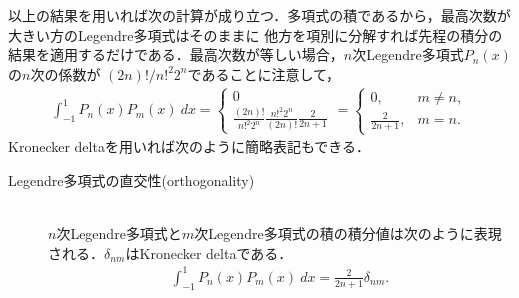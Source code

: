 \documentclass[a4j,papersize,disablejfam,slide,14pt]{jsarticle}
\begin{document}
    以上の結果を用いれば次の計算が成り立つ．多項式の積であるから，最高次数が大きい方の{\rm Legendre}多項式はそのままに
    他方を項別に分解すれば先程の積分の結果を適用するだけである．最高次数が等しい場合，$n$次{\rm Legendre}多項式$P_n(x)$の$n$次の係数が
    $(2n)!/n!^2 2^n$であることに注意して，
    \begin{align}
    	\int_{-1}^{1} P_n(x)P_m(x)\ dx =
        \begin{cases}
        	0 \\
            \frac{(2n)!}{n!^2 2^n} \frac{n!^2 2^n}{(2n)!} \frac{2}{2n+1}
        \end{cases} =
        \begin{cases}
        	0, & m \neq n, \\
            \frac{2}{2n+1}, & m = n.
        \end{cases}
    \end{align}
    {\rm Kronecker delta}を用いれば次のように簡略表記もできる．
    \begin{screen}
    	\begin{description}
        \item[{\rm Legendre}多項式の直交性({\rm orthogonality})]\mbox{}\\
        	$n$次{\rm Legendre}多項式と$m$次{\rm Legendre}多項式の積の積分値は次のように表現される．$\delta_{nm}$は{\rm Kronecker delta}である．
    		\begin{align}
    			\int_{-1}^{1} P_n(x)P_m(x)\ dx = \frac{2}{2n+1} \delta_{nm}. \label{eq:legendre_orthogonality}
    		\end{align}
        \end{description}
    \end{screen}
    
\end{document}
